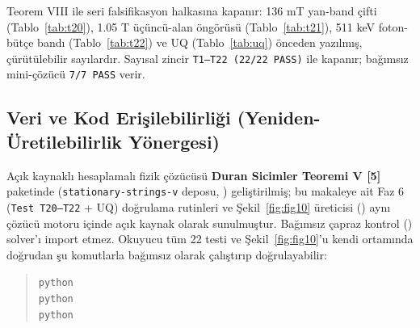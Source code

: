\documentclass[12pt,a4paper]{article}
\begin{document}
Teorem VIII ile seri falsifikasyon halkasına kapanır: 136 mT yan-band çifti (Tablo~\ref{tab:t20}), 1.05 T üçüncü-alan öngörüsü (Tablo~\ref{tab:t21}), 511 keV foton-bütçe bandı (Tablo~\ref{tab:t22}) ve UQ (Tablo~\ref{tab:uq}) önceden yazılmış, çürütülebilir sayılardır. Sayısal zincir \texttt{T1--T22 (22/22 PASS)} ile kapanır; bağımsız mini-çözücü \texttt{7/7 PASS} verir.

\subsection*{Veri ve Kod Erişilebilirliği (Yeniden-Üretilebilirlik Yönergesi)}

Açık kaynaklı hesaplamalı fizik çözücüsü \textbf{Duran Sicimler Teoremi V [5]} paketinde (\texttt{stationary-strings-v} deposu, ) geliştirilmiş; bu makaleye ait Faz 6 (\texttt{Test T20--T22} + UQ) doğrulama rutinleri ve Şekil~\ref{fig:fig10} üreticisi () aynı çözücü motoru içinde açık kaynak olarak sunulmuştur. Bağımsız çapraz kontrol () solver'ı import etmez. Okuyucu tüm 22 testi ve Şekil~\ref{fig:fig10}'u kendi ortamında doğrudan şu komutlarla bağımsız olarak çalıştırıp doğrulayabilir:
\begin{quote}
\small
\texttt{python}  \\
\texttt{python}  \\
\texttt{python} 
\end{quote}
\end{document}
